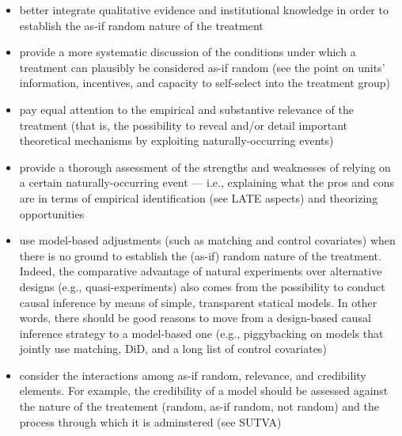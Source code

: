 \documentclass[11pt, english]{article}
\begin{document}
\begin{itemize}
    \item better integrate qualitative evidence and institutional knowledge in
        order to establish the as-if random nature of the treatment
    \item provide a more systematic discussion of the conditions under which a
        treatment can plausibly be considered as-if random  (see the point on 
        units' information, incentives, and capacity to self-select into the
        treatment group) 
    \item pay equal attention to the empirical and substantive relevance of the
        treatment (that is, the possibility to reveal and/or detail important 
        theoretical mechanisms by exploiting naturally-occurring events)
    \item provide a thorough assessment of the strengths and weaknesses of 
        relying on a certain naturally-occurring event --- i.e., explaining what
        the pros and cons are in terms of empirical identification (see LATE aspects)
        and theorizing opportunities 
    \item use model-based adjustments (such as matching and control covariates)
        when there is no ground to establish the (as-if) random nature of the 
        treatment. Indeed, the comparative advantage of natural experiments over
        alternative designs (e.g., quasi-experiments) also comes from the 
        possibility to conduct causal inference by means of simple, transparent 
        statical models. In other words, there should be good reasons to
        move from a design-based causal inference strategy to a model-based one
        (e.g., piggybacking on models that jointly use matching, DiD, and a long
        list of control covariates)
    \item consider the interactions among as-if random, relevance, and 
        credibility elements. For example, the credibility of a model should be 
        assessed against the nature of the treatement (random, as-if random, not
        random) and the process through which it is adminstered (see SUTVA)
\end{itemize}

\clearpage



\end{document}
